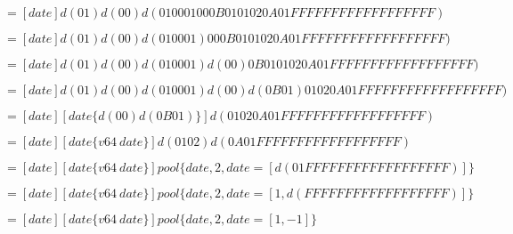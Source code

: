 $=[date] d(01) d(00) d(01 00 01 00  0B 01  01 02  0A 01 FF FF  FF FF FF FF  FF FF FF)$

$=[date] d(01) d(00) d(01 00 01) 00  0B 01  01 02  0A 01 FF FF  FF FF FF FF  FF FF FF)$

$=[date] d(01) d(00) d(01 00 01) d(00) 0B 01  01 02  0A 01 FF FF  FF FF FF FF  FF FF FF)$

$=[date] d(01) d(00) d(01 00 01) d(00) d(0B 01)  01 02  0A 01 FF FF  FF FF FF FF  FF FF FF)$

$=[date] [date \{d(00) d(0B 01)\}] d( 01 02 0A 01 FF FF  FF FF FF FF  FF FF FF)$

$=[date] [date \{v64\ date\}] d(01 02) d(0A 01 FF FF  FF FF FF FF  FF FF FF)$

$=[date] [date \{v64\ date\}] pool\{date, 2, date=[d(01 FF FF  FF FF FF FF  FF FF FF)]\}$

$=[date] [date \{v64\ date\}] pool\{date, 2, date=[1,d(FF FF  FF FF FF FF  FF FF FF)]\}$

$=[date] [date \{v64\ date\}] pool\{date, 2, date=[1,-1]\}$
